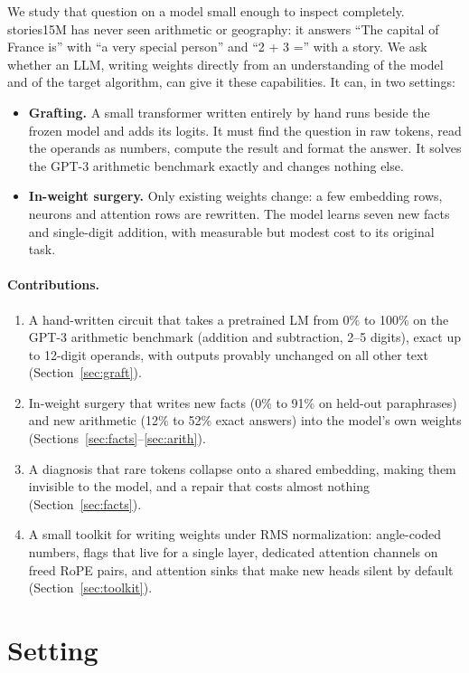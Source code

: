 \documentclass[11pt]{article}
\begin{document}
We study that question on a model small enough to inspect completely. stories15M has never seen arithmetic or geography: it answers ``The capital of France is'' with ``a very special person'' and ``2 + 3 ='' with a story. We ask whether an LLM, writing weights directly from an understanding of the model and of the target algorithm, can give it these capabilities. It can, in two settings:
\begin{itemize}[leftmargin=*]
\item \textbf{Grafting.} A small transformer written entirely by hand runs beside the frozen model and adds its logits. It must find the question in raw tokens, read the operands as numbers, compute the result and format the answer. It solves the GPT-3 arithmetic benchmark exactly and changes nothing else.
\item \textbf{In-weight surgery.} Only existing weights change: a few embedding rows, neurons and attention rows are rewritten. The model learns seven new facts and single-digit addition, with measurable but modest cost to its original task.
\end{itemize}

\paragraph{Contributions.}
\begin{enumerate}[leftmargin=*]
\item A hand-written circuit that takes a pretrained LM from 0\% to 100\% on the GPT-3 arithmetic benchmark (addition and subtraction, 2--5 digits), exact up to 12-digit operands, with outputs provably unchanged on all other text (Section~\ref{sec:graft}).
\item In-weight surgery that writes new facts (0\% to 91\% on held-out paraphrases) and new arithmetic (12\% to 52\% exact answers) into the model's own weights (Sections~\ref{sec:facts}--\ref{sec:arith}).
\item A diagnosis that rare tokens collapse onto a shared embedding, making them invisible to the model, and a repair that costs almost nothing (Section~\ref{sec:facts}).
\item A small toolkit for writing weights under RMS normalization: angle-coded numbers, flags that live for a single layer, dedicated attention channels on freed RoPE pairs, and attention sinks that make new heads silent by default (Section~\ref{sec:toolkit}).
\end{enumerate}

\section{Setting}
\end{document}
